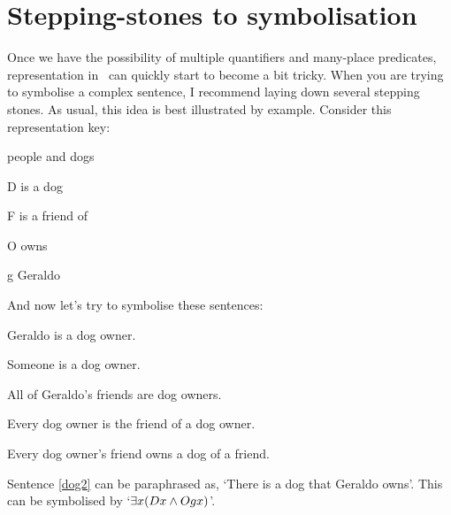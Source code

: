 

\section{Stepping-stones to symbolisation}
Once we have the possibility of multiple quantifiers and many-place predicates, representation in \FOL\ can quickly start to become a bit tricky. When you are trying to symbolise a complex sentence, I recommend laying down several stepping stones. As usual, this idea is best illustrated by example. Consider this representation key:
\begin{ekey}
\item[\text{domain}] people and dogs
\item[D]  is a dog
\item[F]  is a friend of 
\item[O]  owns 
\item[g] Geraldo
\end{ekey}
And now let's try to symbolise these sentences:
\begin{earg}
\item[\ex{dog2}] Geraldo is a dog owner.
\item[\ex{dog3}] Someone is a dog owner.
\item[\ex{dog4}] All of Geraldo's friends are dog owners.
\item[\ex{dog5}] Every dog owner is the friend of a dog owner.
\item[\ex{dog6}] Every dog owner's friend owns a dog of a friend.
\end{earg}
Sentence \ref{dog2} can be paraphrased as, `There is a dog that Geraldo owns'. This can be symbolised by `$\exists x(Dx \wedge Ogx)$'.

